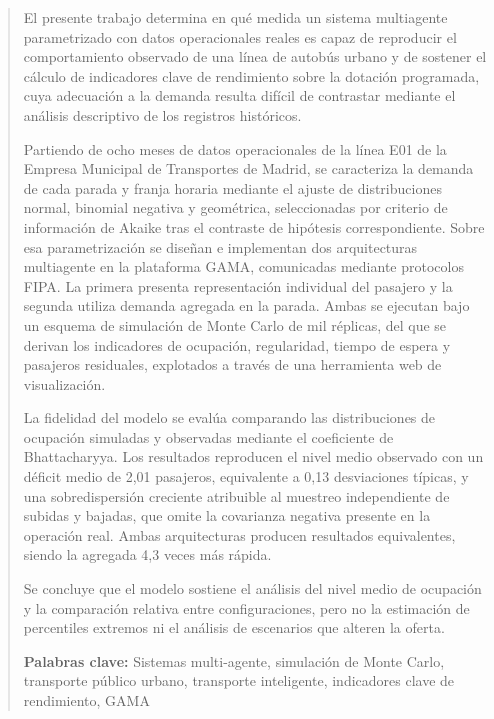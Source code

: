 \documentclass[12pt]{report} %
\begin{document}
\renewcommand\abstractname{\large\bfseries\filcenter\uppercase{Resumen}}
\begin{abstract}
\thispagestyle{plain}
\setcounter{page}{3}
	
El presente trabajo determina en qué medida un sistema multiagente parametrizado
con datos operacionales reales es capaz de reproducir el comportamiento observado
de una línea de autobús urbano y de sostener el cálculo de indicadores clave de
rendimiento sobre la dotación programada, cuya adecuación a la demanda resulta
difícil de contrastar mediante el análisis descriptivo de los registros históricos.

Partiendo de ocho meses de datos operacionales de la línea E01 de la Empresa
Municipal de Transportes de Madrid, se caracteriza la demanda de cada parada y
franja horaria mediante el ajuste de distribuciones normal, binomial negativa y
geométrica, seleccionadas por criterio de información de Akaike tras el contraste
de hipótesis correspondiente. Sobre esa parametrización se diseñan e implementan
dos arquitecturas multiagente en la plataforma GAMA, comunicadas mediante
protocolos FIPA. La primera presenta representación individual del pasajero y la
segunda utiliza demanda agregada en la parada. Ambas se ejecutan
bajo un esquema de simulación de Monte Carlo de mil réplicas, del que se derivan
los indicadores de ocupación, regularidad, tiempo de espera y pasajeros residuales,
explotados a través de una herramienta web de visualización.

La fidelidad del modelo se evalúa comparando las distribuciones de ocupación
simuladas y observadas mediante el coeficiente de Bhattacharyya. Los resultados
reproducen el nivel medio observado con un déficit medio de 2,01 pasajeros,
equivalente a 0,13 desviaciones típicas, y una sobredispersión creciente atribuible
al muestreo independiente de subidas y bajadas, que omite la covarianza negativa
presente en la operación real. Ambas arquitecturas producen resultados equivalentes,
siendo la agregada 4,3 veces más rápida.

Se concluye que el modelo sostiene el análisis del nivel medio de ocupación y la
comparación relativa entre configuraciones, pero no la estimación de percentiles
extremos ni el análisis de escenarios que alteren la oferta.
    
	\textbf{Palabras clave:}
	Sistemas multi-agente, simulación de Monte Carlo, transporte público urbano, transporte inteligente,
	indicadores clave de rendimiento, GAMA
    
    

	\vfill
\end{abstract}
	\newpage %
	\thispagestyle{empty}
	\mbox{}
\end{document}
